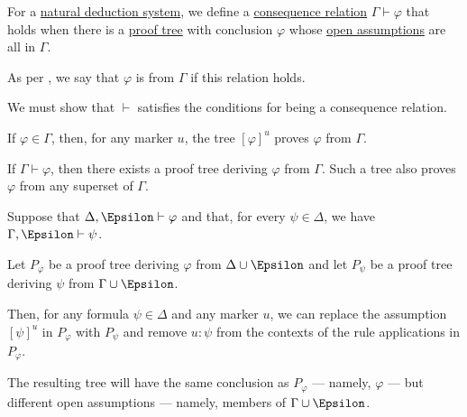 \begin{definition}\label{def:natural_deduction_entailment}
  For a \hyperref[def:propositional_natural_deduction_system]{natural deduction system}, we define a \hyperref[def:consequence_relation]{consequence relation} \( \Gamma \vdash \varphi \) that holds when there is a \hyperref[def:natural_deduction_proof_tree]{proof tree} with conclusion \( \varphi \) whose \hyperref[def:natural_deduction_open_assumptions]{open assumptions} are all in \( \Gamma \).

  As per , we say that \( \varphi \) is  from \( \Gamma \) if this relation holds.
\end{definition}
\begin{defproof}
  We must show that \( {\vdash} \) satisfies the conditions for being a consequence relation.

   If \( \varphi \in \Gamma \), then, for any marker \( u \), the tree \( [\varphi]^u \) proves \( \varphi \) from \( \Gamma \).

   If \( \Gamma \vdash \varphi \), then there exists a proof tree deriving \( \varphi \) from \( \Gamma \). Such a tree also proves \( \varphi \) from any superset of \( \Gamma \).

   Suppose that \( \Delta, \Epsilon \vdash \varphi \) and that, for every \( \psi \in \Delta \), we have \( \Gamma, \Epsilon \vdash \psi \).

  Let \( P_\varphi \) be a proof tree deriving \( \varphi \) from \( \Delta \cup \Epsilon \) and let \( P_\psi \) be a proof tree deriving \( \psi \) from \( \Gamma \cup \Epsilon \).

  Then, for any formula \( \psi \in \Delta \) and any marker \( u \), we can replace the assumption \( [\psi]^u \) in \( P_\varphi \) with \( P_\psi \) and remove \( u: \psi \) from the contexts of the rule applications in \( P_\varphi \).

  The resulting tree will have the same conclusion as \( P_\varphi \) --- namely, \( \varphi \) --- but different open assumptions --- namely, members of \( \Gamma \cup \Epsilon \).
\end{defproof}

